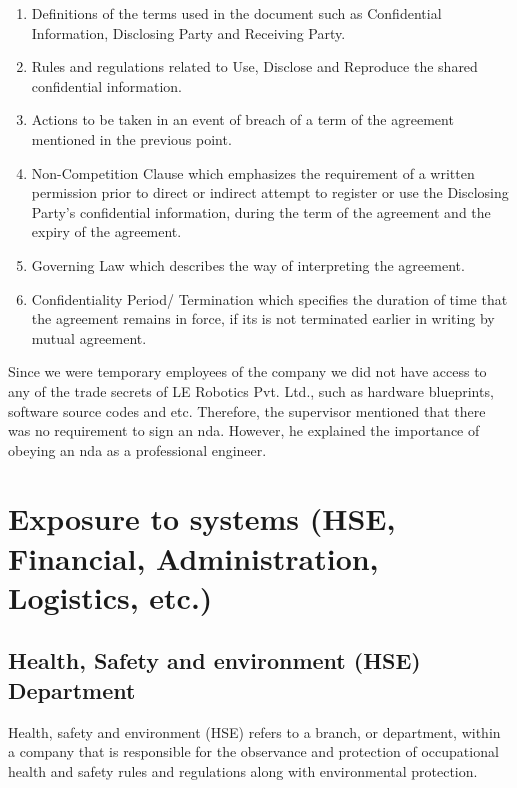 \documentclass[a4paper,12pt]{report}%
\begin{document}
\begin{enumerate}
	\item Definitions of the terms used in the document such as Confidential Information, Disclosing Party and Receiving Party.
	
	\item Rules and regulations related to Use, Disclose and Reproduce the shared confidential information.
	
	\item Actions to be taken in an event of breach of a term of the agreement mentioned in the previous point.
	
	\item Non-Competition Clause which emphasizes the requirement	of a written permission prior to	direct or indirect attempt to register	or use the Disclosing Party’s	confidential information, during the	term of the agreement and the expiry of the agreement.
	
	\item Governing Law which describes the way of interpreting the agreement.
	
	\item Confidentiality Period/ Termination which specifies the duration of time	that the agreement remains in	force, if its is not terminated earlier	in writing by mutual agreement.
\end{enumerate}


Since we were temporary employees of the company we did not have access to any of the trade secrets of LE Robotics Pvt. Ltd., such as hardware blueprints, software source codes and etc. Therefore, the supervisor mentioned that  there  was no requirement to sign an \ac{nda}. However, he explained the importance of obeying an \ac{nda} as a professional engineer.


\chapter{Exposure to systems (HSE, Financial, Administration, Logistics, etc.)}

\section{Health, Safety and environment (HSE) Department}

Health, safety and environment (HSE) refers to a branch, or department, within a company that is responsible for the observance and protection of occupational health and safety rules and regulations along with environmental protection.
\end{document}
